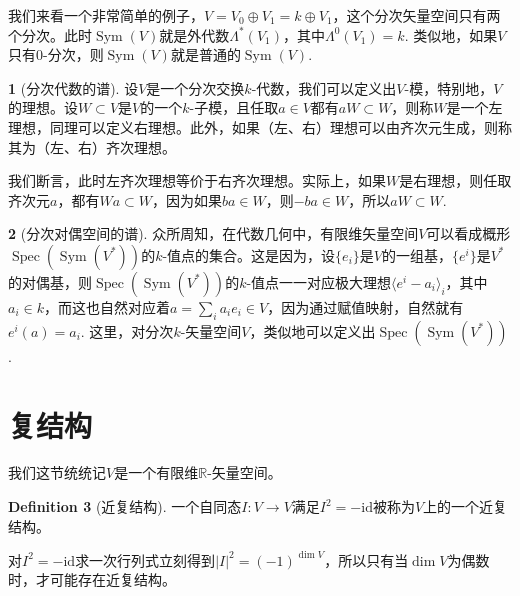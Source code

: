 \documentclass[11pt]{article}
\theoremstyle{definition}
\newtheorem{para}{}[section]
\newtheorem{defi}[para]{Definition}
\theoremstyle{plain}
\begin{document}
我们来看一个非常简单的例子，$V=V_0\oplus V_1=k\oplus V_1$，这个分次矢量空间只有两个分次。此时$\operatorname{Sym}(V)$就是外代数$\Lambda^*(V_1)$，其中$\Lambda^0(V_1)=k$. 类似地，如果$V$只有$0$-分次，则$\operatorname{Sym}(V)$就是普通的$\operatorname{Sym}(V)$.

\begin{para}[分次代数的谱]
    设$V$是一个分次交换$k$-代数，我们可以定义出$V$-模，特别地，$V$的理想。设$W\subset V$是$V$的一个$k$-子模，且任取$a\in V$都有$aW\subset W$，则称$W$是一个左理想，同理可以定义右理想。此外，如果（左、右）理想可以由齐次元生成，则称其为（左、右）齐次理想。

    我们断言，此时左齐次理想等价于右齐次理想。实际上，如果$W$是右理想，则任取齐次元$a$，都有$Wa\subset W$，因为如果$ba\in W$，则$-ba\in W$，所以$aW\subset W$.
\end{para}

\begin{para}[分次对偶空间的谱]
    众所周知，在代数几何中，有限维矢量空间$V$可以看成概形$\operatorname{Spec}(\operatorname{Sym}(V^*))$的$k$-值点的集合。这是因为，设$\{e_i\}$是$V$的一组基，$\{e^i\}$是$V^*$的对偶基，则$\operatorname{Spec}(\operatorname{Sym}(V^*))$的$k$-值点一一对应极大理想$\langle e^i-a_i\rangle_i$，其中$a_i\in k$，而这也自然对应着$a=\sum_i a_ie_i\in V$，因为通过赋值映射，自然就有$e^i(a)=a_i$. 这里，对分次$k$-矢量空间$V$，类似地可以定义出$\operatorname{Spec}(\operatorname{Sym}(V^*))$.
\end{para}

\section{复结构}

我们这节统统记$V$是一个有限维$\mathbb R$-矢量空间。

\begin{defi}[近复结构]
    一个自同态$I:V\to V$满足$I^2=-\mathrm{id}$被称为$V$上的一个近复结构。
\end{defi}

对$I^2=-\mathrm{id}$求一次行列式立刻得到$|I|^2=(-1)^{\dim V}$，所以只有当$\dim V$为偶数时，才可能存在近复结构。
\end{document}

